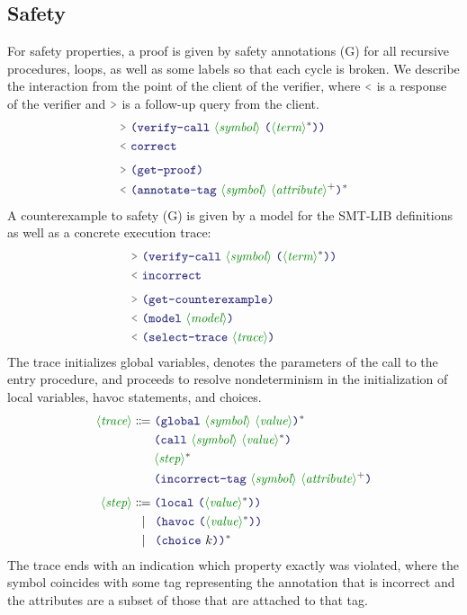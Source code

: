 \documentclass[runningheads]{llncs}
\begin{document}
\subsection{Safety}

For safety properties, a proof is given by safety annotations (G)
for all recursive procedures, loops, as well as some labels so that each cycle is broken.
We describe the interaction from the point of the client of the verifier,
where $\RES$ is a response of the verifier
and $\QRY$ is a follow-up query from the client.
\begin{align*}
\QRY~ & \LP \terminal{verify-call}~
            \nonterminal{symbol}~
            \LP \nonterminal{term}\rstar \RP
        \RP \notag \\
\RES~ & \terminal{correct} \\[4pt]
\QRY~ & \LP \terminal{get-proof} \RP \\
\RES~ & \LP \terminal{annotate-tag}~
           \nonterminal{symbol}~
           \nonterminal{attribute}\rplus
                 \RP \rstar
\end{align*}
A counterexample to safety (G) is given by a model for the SMT-LIB
definitions as well as a concrete execution trace:
\begin{align*}
\QRY~ & \LP \terminal{verify-call}~
            \nonterminal{symbol}~
            \LP \nonterminal{term}\rstar \RP
        \RP \notag \\
\RES~ & \terminal{incorrect} \\[4pt]
\QRY~ & \LP \terminal{get-counterexample} \RP \\
\RES~ & \LP \terminal{model}~  \nonterminal{model} \RP \\
\RES~ & \LP \terminal{select-trace}~  \nonterminal{trace} \RP
\end{align*}
The trace initializes global variables, denotes the parameters
of the call to the entry procedure,
and proceeds to resolve nondeterminism in the initialization of local variables,
havoc statements, and choices.
\begin{align*}
\nonterminal{trace}
    & \Coloneqq
            \LP \terminal{global}~ \nonterminal{symbol}~\nonterminal{value} \RP\rstar \\
    & \altspace \LP \terminal{call}~   \nonterminal{symbol}~\nonterminal{value}\rstar \RP \\
    & \altspace     \nonterminal{step}\rstar \\
    & \altspace \LP \terminal{incorrect-tag}~\nonterminal{symbol}~
                        \nonterminal{attribute}\rplus \RP \\[4pt]
\nonterminal{step}
    & \Coloneqq \LP \terminal{local}~  \LP \nonterminal{value}\rstar \RP \RP \\
    & \alt      \LP \terminal{havoc}~  \LP \nonterminal{value}\rstar \RP \RP \\
    & \alt      \LP \terminal{choice}~  k \RP \RP\rstar
\end{align*}
The trace ends with an indication which property exactly was violated,
where the symbol coincides with some tag representing
the annotation that is incorrect and the attributes
are a subset of those that are attached to that tag.
\end{document}
